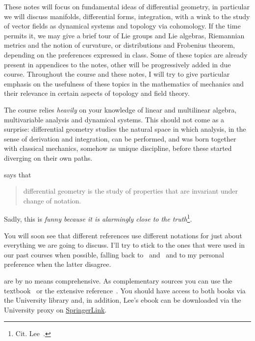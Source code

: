 \documentclass[nobib, a4paper]{tufte-book}
\theoremstyle{plain}
\theoremstyle{definition}
\theoremstyle{remark}
\begin{document}
These notes will focus on fundamental ideas of differential geometry, in particular we will discuss manifolds, differential forms, integration, with a wink to the study of vector fields as dynamical systems and topology via cohomology.
If the time permits it, we may give a brief tour of Lie groups and Lie algebras, Riemannian metrics and the notion of curvature, or distributions and Frobenius theorem, depending on the preferences expressed in class.
Some of these topics are already present in appendices to the notes, other will be progressively added in due course.
Throughout the course and these notes, I will try to give particular emphasis on the usefulness of these topics in the mathematics of mechanics and their relevance in certain aspects of topology and field theory.

The course relies \emph{heavily} on your knowledge of linear and multilinear algebra, multivariable analysis and dynamical systems.
This should not come as a surprise: differential geometry studies the natural space in which analysis, in the sense of derivation and integration, can be performed, and was born together with classical mechanics, somehow as unique discipline, before these started diverging on their own paths.

 says that
\begin{quote}
	differential geometry is the study of properties that are invariant under change of notation.
\end{quote}
Sadly, this is \emph{funny because it is alarmingly close to the truth}\footnote{Cit. Lee~\cite{book:lee}.}.

You will soon see that different references use different notations for just about everything we are going to discuss.
I'll try to stick to the ones that were used in our past courses when possible, falling back to~\cite{book:lee} and~\cite{book:tu} and to my personal preference when the latter disagree.

 are by no means comprehensive.
As complementary sources you can use the textbook~\cite{book:tu} or the extensive reference~\cite{book:lee}.
You should have access to both books via the University library and, in addition, Lee's ebook can be downloaded via the University proxy on \href{https://link.springer.com/book/10.1007/978-1-4419-9982-5}{SpringerLink}.
\end{document}
